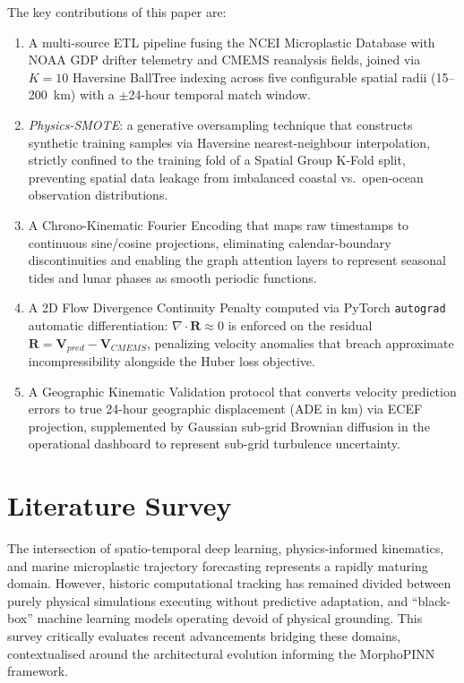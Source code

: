 \documentclass[conference]{IEEEtran}
\begin{document}
The key contributions of this paper are:
\begin{enumerate}
    \item A multi-source ETL pipeline fusing the NCEI Microplastic Database with NOAA GDP drifter telemetry and CMEMS reanalysis fields, joined via $K=10$ Haversine BallTree indexing across five configurable spatial radii (15--200~km) with a $\pm$24-hour temporal match window.
    \item \textit{Physics-SMOTE}: a generative oversampling technique that constructs synthetic training samples via Haversine nearest-neighbour interpolation, strictly confined to the training fold of a Spatial Group K-Fold split, preventing spatial data leakage from imbalanced coastal vs.\ open-ocean observation distributions.
    \item A Chrono-Kinematic Fourier Encoding that maps raw timestamps to continuous sine/cosine projections, eliminating calendar-boundary discontinuities and enabling the graph attention layers to represent seasonal tides and lunar phases as smooth periodic functions.
    \item A 2D Flow Divergence Continuity Penalty computed via PyTorch \texttt{autograd} automatic differentiation: $\nabla \cdot \mathbf{R} \approx 0$ is enforced on the residual $\mathbf{R} = \mathbf{V}_{pred} - \mathbf{V}_{CMEMS}$, penalizing velocity anomalies that breach approximate incompressibility alongside the Huber loss objective.
    \item A Geographic Kinematic Validation protocol that converts velocity prediction errors to true 24-hour geographic displacement (ADE in km) via ECEF projection, supplemented by Gaussian sub-grid Brownian diffusion in the operational dashboard to represent sub-grid turbulence uncertainty.
\end{enumerate}

\section{Literature Survey}

The intersection of spatio-temporal deep learning, physics-informed kinematics, and marine microplastic trajectory forecasting represents a rapidly maturing domain. However, historic computational tracking has remained divided between purely physical simulations executing without predictive adaptation, and ``black-box'' machine learning models operating devoid of physical grounding. This survey critically evaluates recent advancements bridging these domains, contextualised around the architectural evolution informing the MorphoPINN framework.
\end{document}
